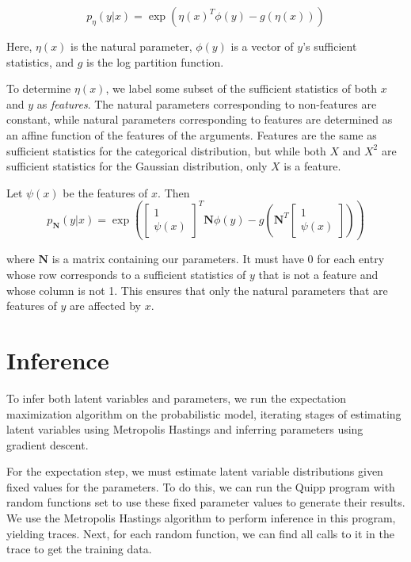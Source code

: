 \documentclass{article}
\begin{document}
    $$p_{\eta}(y | x) = \exp\left(\eta(x)^T \phi(y) - g(\eta(x))\right)$$

    Here, $\eta(x)$ is the natural parameter, $\phi(y)$ is a vector of $y$'s sufficient statistics,
    and $g$ is the log partition function.

    To determine $\eta(x)$, we label
    some subset of the sufficient statistics of both $x$ and $y$ as \emph{features}.  The natural
    parameters corresponding to non-features are constant, while natural
    parameters corresponding to features are determined as an affine
    function of the features of the arguments.  Features are the same as sufficient
    statistics for the categorical distribution, but while both $X$ and $X^2$ are
    sufficient statistics for the Gaussian distribution, only $X$ is a feature.

    Let $\psi(x)$ be the features of $x$.  Then
    $$p_{\mathbf{N}}(y | x) = \exp\left(\begin{bmatrix} 1 \\ \psi(x) \end{bmatrix} ^T \mathbf{N} \phi(y) - g\left(\mathbf{N}^T \begin{bmatrix} 1 \\ \psi(x) \end{bmatrix}\right)\right)$$

    where $\mathbf{N}$ is a matrix containing our parameters.  It must have 0 for each entry whose row corresponds
    to a sufficient statistics of $y$ that is not a feature and whose column is not 1.
    This ensures that only the
    natural parameters that are features of $y$ are affected by $x$.


  \section{Inference}

    To infer both latent variables and parameters, we run the
    expectation maximization algorithm on the probabilistic model, iterating stages of
    estimating latent variables using Metropolis Hastings and inferring
    parameters using gradient descent.

    For the expectation step, we must estimate latent variable distributions given
    fixed values for the parameters.  To do this, we can run the Quipp program
    with random functions set to use these fixed parameter values to generate their results.
    We use the Metropolis Hastings algorithm to perform inference in this program,
    yielding traces.  Next, for each random function, we can find all calls
    to it in the trace to get the training data.
\end{document}
